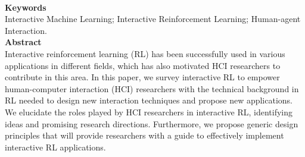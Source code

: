 \documentclass[report.tex]{subfiles}
\begin{document}
\\


\noindent\textbf{Keywords} \\
Interactive Machine Learning; Interactive Reinforcement Learning; Human-agent Interaction.
   \\

\noindent\textbf{Abstract} \\
Interactive reinforcement learning (RL) has been successfully used in various applications in different fields, which has also motivated HCI researchers to contribute in this area. In this paper, we survey interactive RL to empower human-computer interaction (HCI) researchers with the technical background in RL needed to design new interaction techniques and propose new applications. We elucidate the roles played by HCI researchers in interactive RL, identifying ideas and promising research directions. Furthermore, we propose generic design principles that will provide researchers with a guide to effectively implement interactive RL applications.

\\
\end{document}
